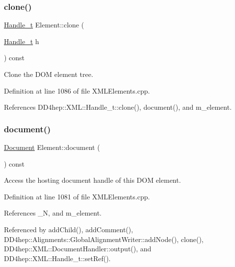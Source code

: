 \subsubsection{\texorpdfstring{clone()}{clone()}\hspace{0.1cm}{\footnotesize\ttfamily [2/2]}}
{\footnotesize\ttfamily \hyperlink{class_d_d4hep_1_1_x_m_l_1_1_handle__t}{Handle\+\_\+t} Element\+::clone (\begin{DoxyParamCaption}\item[{\hyperlink{class_d_d4hep_1_1_x_m_l_1_1_handle__t}{Handle\+\_\+t}}]{h }\end{DoxyParamCaption}) const}



Clone the D\+OM element tree. 



Definition at line 1086 of file X\+M\+L\+Elements.\+cpp.



References D\+D4hep\+::\+X\+M\+L\+::\+Handle\+\_\+t\+::clone(), document(), and m\+\_\+element.

\hypertarget{class_d_d4hep_1_1_x_m_l_1_1_element_a39ec92855a00b5485ed4791ae09569a8}{}\label{class_d_d4hep_1_1_x_m_l_1_1_element_a39ec92855a00b5485ed4791ae09569a8} 
\subsubsection{\texorpdfstring{document()}{document()}}
{\footnotesize\ttfamily \hyperlink{class_d_d4hep_1_1_x_m_l_1_1_document}{Document} Element\+::document (\begin{DoxyParamCaption}{ }\end{DoxyParamCaption}) const}



Access the hosting document handle of this D\+OM element. 



Definition at line 1081 of file X\+M\+L\+Elements.\+cpp.



References \+\_\+N, and m\+\_\+element.



Referenced by add\+Child(), add\+Comment(), D\+D4hep\+::\+Alignments\+::\+Global\+Alignment\+Writer\+::add\+Node(), clone(), D\+D4hep\+::\+X\+M\+L\+::\+Document\+Handler\+::output(), and D\+D4hep\+::\+X\+M\+L\+::\+Handle\+\_\+t\+::set\+Ref().

